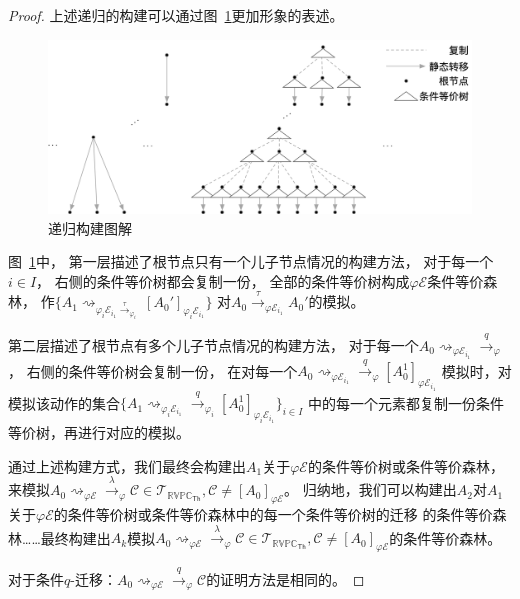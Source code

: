 \begin{proof}
   上述递归的构建可以通过图~\ref{fig:equal_forest}更加形象的表述。
   \begin{figure}[!htbp]
      \small
      \centering
      \includegraphics[width=13cm]{../figures/equality_1.png}
      \caption[]{递归构建图解} 
      \label{fig:equal_forest}
   \end{figure}
   图~\ref{fig:equal_forest}中，
   第一层描述了根节点只有一个儿子节点情况的构建方法，
   对于每一个$i\in I$，
   右侧的条件等价树都会复制一份，
   全部的条件等价树构成$\varphi\mathcal{E}$条件等价森林，
   作$\{A_1\rightsquigarrow_{\varphi_i\mathcal{E}_{i_1}\stackrel{\tau}{\rightarrow}_{\varphi_i}}[A_0']_{\varphi_i\mathcal{E}_{i_1}}\}$
   对$A_0\stackrel{\tau}{\rightarrow}_{\varphi\mathcal{E}_{i_1}}A_0'$的模拟。

   第二层描述了根节点有多个儿子节点情况的构建方法，
   对于每一个$A_0\rightsquigarrow_{\varphi\mathcal{E}_{i_1}}\stackrel{q}{\rightarrow}_{\varphi}$，
   右侧的条件等价树会复制一份，
   在对每一个$A_0\rightsquigarrow_{\varphi\mathcal{E}_{i_1}}\stackrel{q}{\rightarrow}_{\varphi} [A_0^1]_{\varphi\mathcal{E}_{i_1}}$
   模拟时，对模拟该动作的集合$\{A_1\rightsquigarrow_{\varphi_i\mathcal{E}_{i_1}}\stackrel{q}{\rightarrow}_{\varphi_i} [A_0^1]_{\varphi_i\mathcal{E}_{i_1}}\}_{i\in I}$
   中的每一个元素都复制一份条件等价树，再进行对应的模拟。

   通过上述构建方式，我们最终会构建出$A_1$关于$\varphi\mathcal{E}$的条件等价树或条件等价森林，
   来模拟$A_0\rightsquigarrow_{\varphi\mathcal{E}}\stackrel{\lambda}{\rightarrow}_{\varphi} \mathcal{C}\in \mathcal{T}_{\mathbb{RVPC}_{\mathsf{Th}}},\mathcal{C}\neq [A_0]_{\varphi\mathcal{E}}$。
   归纳地，我们可以构建出$A_2$对$A_1$关于$\varphi\mathcal{E}$的条件等价树或条件等价森林中的每一个条件等价树的迁移
   的条件等价森林……最终构建出$A_k$模拟$A_0\rightsquigarrow_{\varphi\mathcal{E}}\stackrel{\lambda}{\rightarrow}_{\varphi} \mathcal{C}\in \mathcal{T}_{\mathbb{RVPC}_{\mathsf{Th}}},\mathcal{C}\neq [A_0]_{\varphi\mathcal{E}}$的条件等价森林。

   对于条件$q$-迁移：$A_0\rightsquigarrow_{\varphi\mathcal{E}}\stackrel{q}{\rightarrow}_{\varphi}\mathcal{C}$的证明方法是相同的。
\end{proof}

